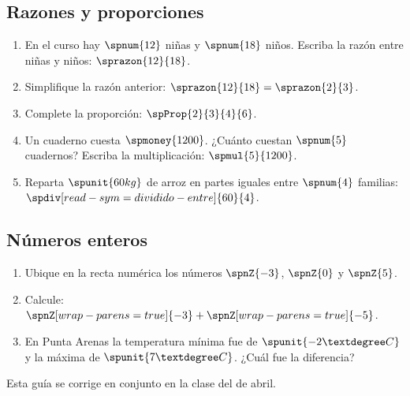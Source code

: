 \documentclass{article}
\begin{document}
\subsection*{Razones y proporciones}

\begin{enumerate}
  \item En el curso hay $\spnum{12}$ niñas y $\spnum{18}$ niños. Escriba la razón entre niñas y niños: $\sprazon{12}{18}$.
  \item Simplifique la razón anterior: $\sprazon{12}{18} = \sprazon{2}{3}$.
  \item Complete la proporción: $\spProp{2}{3}{4}{6}$.
  \item Un cuaderno cuesta $\spmoney{1200}$. ¿Cuánto cuestan $\spnum{5}$ cuadernos? Escriba la multiplicación: $\spmul{5}{1200}$.
  \item Reparta $\spunit{60 kg}$ de arroz en partes iguales entre $\spnum{4}$ familias: $\spdiv[read-sym=dividido-entre]{60}{4}$.
\end{enumerate}

\subsection*{Números enteros}

\begin{enumerate}
  \item Ubique en la recta numérica los números $\spnZ{-3}$, $\spnZ{0}$ y $\spnZ{5}$.
  \item Calcule: $\spnZ[wrap-parens=true]{-3} + \spnZ[wrap-parens=true]{-5}$.
  \item En Punta Arenas la temperatura mínima fue de $\spunit{-2 °C}$ y la máxima de $\spunit{7 °C}$. ¿Cuál fue la diferencia?
\end{enumerate}

Esta guía se corrige en conjunto en la clase del  de abril.
\end{document}

